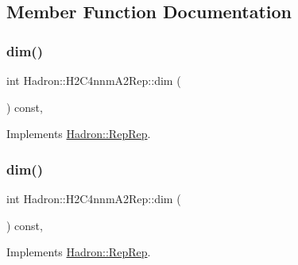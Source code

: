 \subsection{Member Function Documentation}
\mbox{\label{structHadron_1_1H2C4nnmA2Rep_ac698a952586ae314ade8d746e94996fa}} 
\subsubsection{\texorpdfstring{dim()}{dim()}\hspace{0.1cm}{\footnotesize\ttfamily [1/5]}}
{\footnotesize\ttfamily int Hadron\+::\+H2\+C4nnm\+A2\+Rep\+::dim (\begin{DoxyParamCaption}{ }\end{DoxyParamCaption}) const\hspace{0.3cm}{\ttfamily [inline]}, {\ttfamily [virtual]}}



Implements \mbox{\hyperlink{structHadron_1_1RepRep_a92c8802e5ed7afd7da43ccfd5b7cd92b}{Hadron\+::\+Rep\+Rep}}.

\mbox{\label{structHadron_1_1H2C4nnmA2Rep_ac698a952586ae314ade8d746e94996fa}} 
\subsubsection{\texorpdfstring{dim()}{dim()}\hspace{0.1cm}{\footnotesize\ttfamily [2/5]}}
{\footnotesize\ttfamily int Hadron\+::\+H2\+C4nnm\+A2\+Rep\+::dim (\begin{DoxyParamCaption}{ }\end{DoxyParamCaption}) const\hspace{0.3cm}{\ttfamily [inline]}, {\ttfamily [virtual]}}



Implements \mbox{\hyperlink{structHadron_1_1RepRep_a92c8802e5ed7afd7da43ccfd5b7cd92b}{Hadron\+::\+Rep\+Rep}}.

\mbox{\label{structHadron_1_1H2C4nnmA2Rep_ac698a952586ae314ade8d746e94996fa}} 
